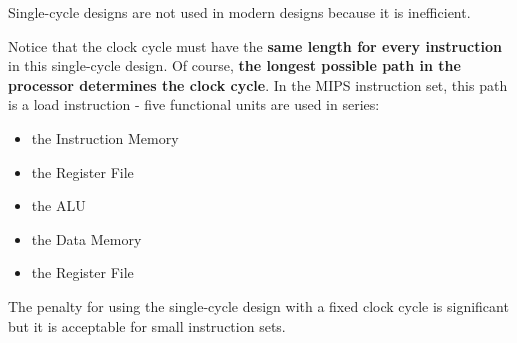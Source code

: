 \documentclass[10pt,a4paper]{article}
\begin{document}
Single-cycle designs are not used in modern designs because it is inefficient.

Notice that the clock cycle must have the \textbf{same length for every instruction} in this
single-cycle design. Of course, \textbf{the longest possible path in the processor determines the clock
cycle}. In the MIPS instruction set, this path is a load instruction - five functional units are
used in series: 
\begin{itemize}
    \item the Instruction Memory
    \item the Register File
    \item the ALU
    \item the Data Memory
    \item the Register File
\end{itemize}

The penalty for using the single-cycle design with a fixed clock cycle is significant but it is acceptable for small instruction sets.


\end{document}
